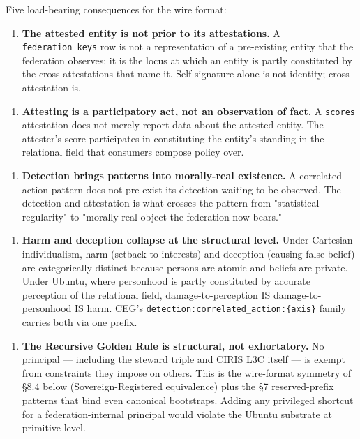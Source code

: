 \documentclass[11pt]{article}
\begin{document}
Five load-bearing consequences for the wire format:


\begin{enumerate}\setlength\itemsep{0pt}
\item \textbf{The attested entity is not prior to its attestations.} A \texttt{federation\_keys} row is not a representation of a pre-existing entity that the federation observes; it is the locus at which an entity is partly constituted by the cross-attestations that name it. Self-signature alone is not identity; cross-attestation is.
\end{enumerate}


\begin{enumerate}\setlength\itemsep{0pt}
\item \textbf{Attesting is a participatory act, not an observation of fact.} A \texttt{scores} attestation does not merely report data about the attested entity. The attester's score participates in constituting the entity's standing in the relational field that consumers compose policy over.
\end{enumerate}


\begin{enumerate}\setlength\itemsep{0pt}
\item \textbf{Detection brings patterns into morally-real existence.} A correlated-action pattern does not pre-exist its detection waiting to be observed. The detection-and-attestation is what crosses the pattern from "statistical regularity" to "morally-real object the federation now bears."
\end{enumerate}


\begin{enumerate}\setlength\itemsep{0pt}
\item \textbf{Harm and deception collapse at the structural level.} Under Cartesian individualism, harm (setback to interests) and deception (causing false belief) are categorically distinct because persons are atomic and beliefs are private. Under Ubuntu, where personhood is partly constituted by accurate perception of the relational field, damage-to-perception IS damage-to-personhood IS harm. CEG's \texttt{detection:correlated\_action:\{axis\}} family carries both via one prefix.
\end{enumerate}


\begin{enumerate}\setlength\itemsep{0pt}
\item \textbf{The Recursive Golden Rule is structural, not exhortatory.} No principal — including the steward triple and CIRIS L3C itself — is exempt from constraints they impose on others. This is the wire-format symmetry of §8.4 below (Sovereign-Registered equivalence) plus the §7 reserved-prefix patterns that bind even canonical bootstraps. Adding any privileged shortcut for a federation-internal principal would violate the Ubuntu substrate at primitive level.
\end{enumerate}
\end{document}
